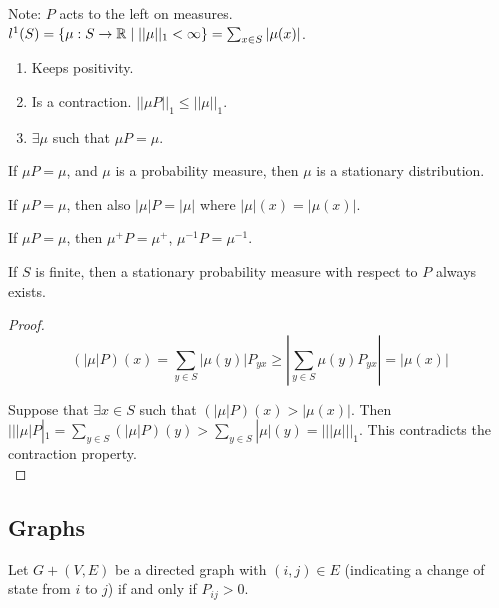 \documentclass[english, course]{Notes}
\begin{document}
Note: $P$ acts to the left on measures.\\

$l^1(S) = \{\mu : S \to \mathbb{R} \mid ||\mu||_1 < \infty\} = \sum_{x \in S} |\mu(x)|$.
\begin{enumerate}
	\item Keeps positivity.
	\item Is a contraction. $||\mu P||_1 \leq ||\mu||_1$.\\
	\item $\exists \mu$ such that $\mu P = \mu$.
\end{enumerate}

\begin{definition}
If $\mu P = \mu$, and $\mu$ is a probability measure, then $\mu$ is a stationary distribution.\\
\end{definition}

\begin{claim}
If $\mu P = \mu$, then also $|\mu|P = |\mu|$ where $|\mu|(x) = |\mu(x)|$.\\
\end{claim}

\begin{corollary}
If $\mu P = \mu$, then $\mu^+ P = \mu^+$, $\mu^{-1} P = \mu^{-1}$.\\
\end{corollary}

\begin{corollary}
If $S$ is finite, then a stationary probability measure with respect to $P$ always exists.\\
\end{corollary}

\begin{proof}
\[(|\mu|P)(x) = \sum_{y \in S} |\mu(y)|P_{yx} \geq |\sum_{y \in S} \mu(y) P_{yx}| = |\mu(x)|\]

Suppose that $\exists x \in S$ such that $(|\mu|P)(x) > |\mu(x)|$. Then $|||\mu|P|_1 = \sum_{y \in S} (|\mu|P)(y) > \sum_{y \in S} |\mu|(y) = |||\mu|||_1$. This contradicts the contraction property.\\
\end{proof}

\subsection{Graphs}

Let $G + (V, E)$ be a directed graph with $(i, j) \in E$ (indicating a change of state from $i$ to $j$) if and only if $P_{ij} > 0$.\\
\end{document}

